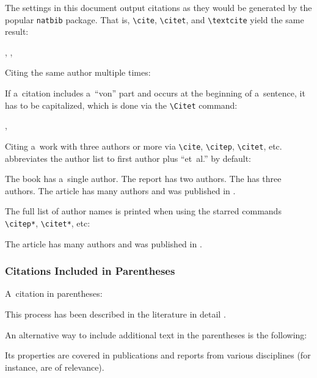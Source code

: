 \documentclass[11pt, a4paper, oneside]{article}
\theoremstyle{Plain}
\theoremstyle{Definition}
\theoremstyle{Remark}
\let \citeOrig \cite
\let \cite \textcite
\let \citealp \citeOrig
\begin{document}
The settings in this document output citations as they would be generated by the popular \texttt{natbib} package. That is, \verb|\cite|, \verb|\citet|, and \verb|\textcite| yield the same result:
\begin{longtblr}{}
	\cite{sarfraz}, \citet{sarfraz}, \textcite{sarfraz}
\end{longtblr}
\noindent Citing the same author multiple times:
\begin{longtblr}{}
	\cite{aristotle:anima, aristotle:physics, aristotle:poetics} \textellipsis
\end{longtblr}

If a~citation includes a~``von'' part and occurs at the beginning of a~sentence, it has to be capitalized, which is done via the \verb|\Citet| command:
\begin{longtblr}{}
	 \textellipsis, \citet{vangennep} \textellipsis
\end{longtblr}

Citing a~work with three authors or more via \verb|\cite|, \verb|\citep|, \verb|\citet|, etc. abbreviates the author list to first author plus ``et~al.'' by default:
\begin{longtblr}{}
	The book  \citep{gerhardt} has a~single author.
	The report  \citep{chiu} has two authors.
	The  \citep{companion} has three authors.
	The article  \citep{murray} has many authors and was published in \mkbibemph{}.
\end{longtblr}
\noindent The full list of author names is printed when using the starred commands \verb|\citep*|, \verb|\citet*|, etc:
\begin{longtblr}{}
	The article  \citep*{murray} has many authors and was published in \mkbibemph{}.
\end{longtblr}

\subsubsection{Citations Included in Parentheses}

A~citation in parentheses:
\begin{longtblr}{}
	This process has been described in the literature in detail \citep[see][and the references therein]{gerhardt}.
\end{longtblr}
\noindent An alternative way to include additional text in the parentheses is the following:
\begin{longtblr}{}
	Its properties are covered in publications and reports from various disciplines (for instance, \citealp{chiu, markey, padhye, sarfraz} are of relevance).
\end{longtblr}
\end{document}
